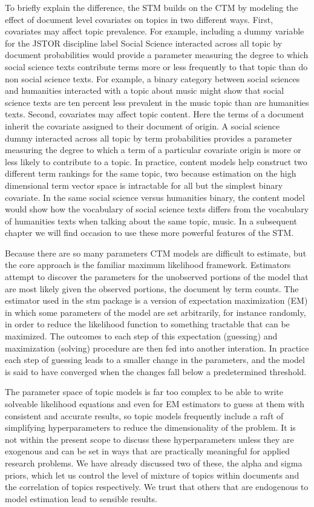 \documentclass[]{book}
\theoremstyle{definition}
\theoremstyle{definition}
\theoremstyle{definition}
\theoremstyle{remark}
\begin{document}
To briefly explain the difference, the STM builds on the CTM by modeling
the effect of document level covariates on topics in two different ways.
First, covariates may affect topic prevalence. For example, including a
dummy variable for the JSTOR discipline label Social Science interacted
across all topic by document probabilities would provide a parameter
measuring the degree to which social science texts contribute terms more
or less frequently to that topic than do non social science texts. For
example, a binary category between social sciences and humanities
interacted with a topic about music might show that social science texts
are ten percent less prevalent in the music topic than are humanities
texts. Second, covariates may affect topic content. Here the terms of a
document inherit the covariate assigned to their document of origin. A
social science dummy interacted across all topic by term probabilities
provides a parameter measuring the degree to which a term of a
particular covariate origin is more or less likely to contribute to a
topic. In practice, content models help construct two different term
rankings for the same topic, two because estimation on the high
dimensional term vector space is intractable for all but the simplest
binary covariate. In the same social science versus humanities binary,
the content model would show how the vocabulary of social science texts
differs from the vocabulary of humanities texts when talking about the
same topic, music. In a subsequent chapter we will find occasion to use
these more powerful features of the STM.

Because there are so many parameters CTM models are difficult to
estimate, but the core approach is the familiar maximum likelihood
framework. Estimators attempt to discover the parameters for the
unobserved portions of the model that are most likely given the observed
portions, the document by term counts. The estimator used in the stm
package is a version of expectation maximization (EM) in which some
parameters of the model are set arbitrarily, for instance randomly, in
order to reduce the likelihood function to something tractable that can
be maximized. The outcomes to each step of this expectation (guessing)
and maximization (solving) procedure are then fed into another
interation. In practice each step of guessing leads to a smaller change
in the parameters, and the model is said to have converged when the
changes fall below a predetermined threshold.

The parameter space of topic models is far too complex to be able to
write solveable likelihood equations and even for EM estimators to guess
at them with consistent and accurate results, so topic models frequently
include a raft of simplifying hyperparameters to reduce the
dimensionality of the problem. It is not within the present scope to
discuss these hyperparameters unless they are exogenous and can be set
in ways that are practically meaningful for applied research problems.
We have already discussed two of these, the alpha and sigma priors,
which let us control the level of mixture of topics within documents and
the correlation of topics respectively. We trust that others that are
endogenous to model estimation lead to sensible results.
\end{document}
